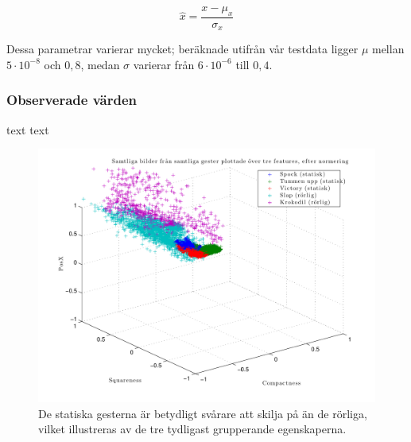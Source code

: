 \documentclass[../rapport_MVEX01-11-05]{subfiles}
\begin{document}
\begin{equation*}
	\hat{x} = \frac{x - \mu_x}{\sigma_x}
\end{equation*}

Dessa parametrar varierar mycket; beräknade utifrån vår testdata ligger $\mu$
mellan $5\cdot10^{-8}$ och $0,8$, medan $\sigma$ varierar från $6\cdot10^{-6}$
till $0,4$.

\subsubsection{Observerade värden}

text text

\begin{figure}[htbp]
  \centering
  \includegraphics[width=\textwidth]{bilder/feats-1+6+7}
  \caption{De statiska gesterna är betydligt svårare att skilja på än
  de rörliga, vilket illustreras av de tre tydligast grupperande
  egenskaperna.}
  \label{fig:feats167}
\end{figure}
\end{document}
